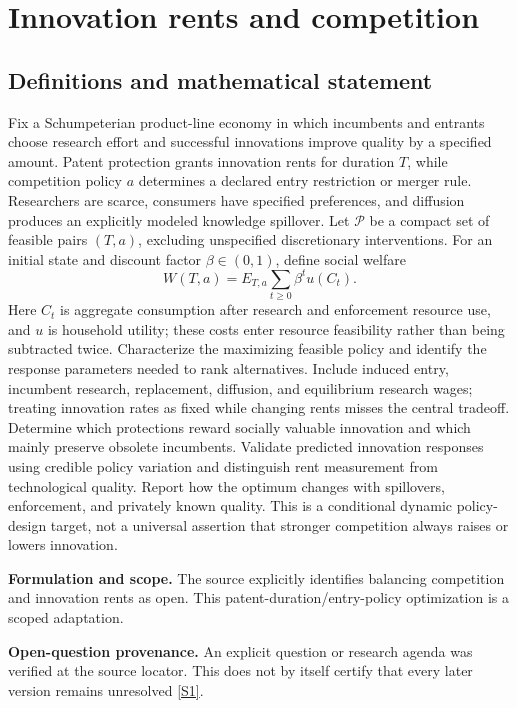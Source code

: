 \documentclass[11pt]{article}
\newcommand{\sref}[2]{\hyperlink{source:#1:#2}{[S#2]}}
\begin{document}
\section*{Innovation rents and competition}\label{30007549}
\subsection{Definitions and mathematical statement}
Fix a Schumpeterian product-line economy in which incumbents and entrants choose research effort and successful innovations improve quality by a specified amount. Patent protection grants innovation rents for duration \(T\), while competition policy \(a\) determines a declared entry restriction or merger rule. Researchers are scarce, consumers have specified preferences, and diffusion produces an explicitly modeled knowledge spillover. Let \(\mathcal P\) be a compact set of feasible pairs \((T,a)\), excluding unspecified discretionary interventions.
For an initial state and discount factor \(\beta\in(0,1)\), define social welfare
\[
W(T,a)=E_{T,a}\sum_{t\ge0}\beta^t
u(C_t).
\]
Here \(C_t\) is aggregate consumption after research and enforcement resource use, and \(u\) is household utility; these costs enter resource feasibility rather than being subtracted twice. Characterize the maximizing feasible policy and identify the response parameters needed to rank alternatives. Include induced entry, incumbent research, replacement, diffusion, and equilibrium research wages; treating innovation rates as fixed while changing rents misses the central tradeoff. Determine which protections reward socially valuable innovation and which mainly preserve obsolete incumbents. Validate predicted innovation responses using credible policy variation and distinguish rent measurement from technological quality. Report how the optimum changes with spillovers, enforcement, and privately known quality. This is a conditional dynamic policy-design target, not a universal assertion that stronger competition always raises or lowers innovation.

\par\textbf{Formulation and scope.} The source explicitly identifies balancing competition and innovation rents as open. This patent-duration/entry-policy optimization is a scoped adaptation.

\par\textbf{Open-question provenance.} An explicit question or research agenda was verified at the source locator. This does not by itself certify that every later version remains unresolved \sref{30007549}{1}.
\end{document}
